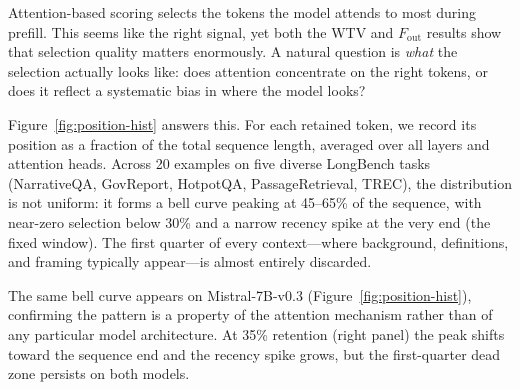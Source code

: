\documentclass[10pt,letterpaper]{article}
\begin{document}
Attention-based scoring selects the tokens the model attends to most during
prefill.  This seems like the right signal, yet both the WTV and \(F_{\text{out}}\)
results show that selection quality matters enormously.  A natural question is
\emph{what} the selection actually looks like: does attention concentrate on the
right tokens, or does it reflect a systematic bias in where the model looks?

Figure~\ref{fig:position-hist} answers this.  For each retained token, we record
its position as a fraction of the total sequence length, averaged over all layers
and attention heads.  Across 20 examples on five diverse LongBench tasks
(NarrativeQA, GovReport, HotpotQA, PassageRetrieval, TREC), the distribution is
not uniform: it forms a bell curve peaking at 45--65\% of the sequence, with
near-zero selection below 30\% and a narrow recency spike at the very end (the
fixed window).  The first quarter of every context---where background, definitions,
and framing typically appear---is almost entirely discarded.

The same bell curve appears on Mistral-7B-v0.3 (Figure~\ref{fig:position-hist}),
confirming the pattern is a property of the attention mechanism rather
than of any particular model architecture. At 35\% retention (right panel)
the peak shifts toward the sequence end and the recency spike grows, but
the first-quarter dead zone persists on both models.
\end{document}
